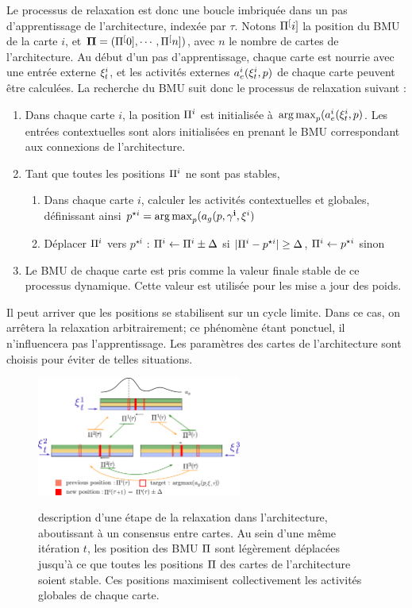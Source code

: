Le processus de relaxation est donc une boucle imbriquée dans un pas d'apprentissage de l'architecture, indexée par $\tau$. Notons $\Pi^{[}i]$ la position du BMU de la carte $i$, et $\mathbf{\Pi} = (\Pi^{[}0], \cdots , \Pi^{[}n])$, avec $n$ le nombre de cartes de l'architecture.
Au début d'un pas d'apprentissage, chaque carte est nourrie avec une entrée externe $\xi^i_t$, et les activités externes $a_e^i(\xi^i_t,p)$ de chaque carte peuvent être calculées.
La recherche du BMU suit donc le processus de relaxation suivant : 
\begin{enumerate}
\item Dans chaque carte $i$, la position $\Pi^i$ est initialisée à $\operatorname*{arg\,max}_p(a_e^i(\xi^i_t,p)$. Les entrées contextuelles sont alors initialisées en prenant le BMU correspondant aux connexions de l'architecture.
\item Tant que toutes les positions $\Pi^i$ ne sont pas stables, 
	\begin{enumerate}
	\item Dans chaque carte $i$, calculer les activités contextuelles et globales, définissant ainsi $p^{\star i} = \operatorname*{arg\,max}_p(a_g(p,\mathbf{\gamma^i},\xi^i)$
	\item Déplacer $\Pi^i$ vers $p^{\star i}$ : $\Pi^i \leftarrow \Pi^i \pm \Delta$ si $\lvert \Pi^i - p^{\star i} \rvert \geq \Delta$, $\Pi^i \leftarrow p^{\star i}$ sinon
	\end{enumerate}
	
\item Le BMU de chaque carte est pris comme la valeur finale stable de ce processus dynamique. Cette valeur est utilisée pour les mise a jour des poids.
\end{enumerate}

Il peut arriver que les positions se stabilisent sur un cycle limite. Dans ce cas, on arrêtera la relaxation arbitrairement; ce phénomène étant ponctuel, il n'influencera pas l'apprentissage. Les paramètres des cartes de l'architecture sont choisis pour éviter de telles situations.

\begin{figure}
\centering
\includegraphics[width=0.6\textwidth]{relaxation.pdf}
\label{fig:relax}
\caption{description d'une étape de la relaxation dans l'architecture, aboutissant à un consensus entre cartes. Au sein d'une même itération $t$, les position des BMU $\Pi$ sont légèrement déplacées jusqu'à ce que toutes les positions $\Pi$ des cartes de l'architecture soient stable. Ces positions maximisent collectivement les activités globales de chaque carte. }
\end{figure}

